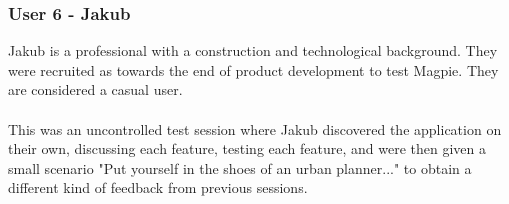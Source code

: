\subsubsection{User 6 - Jakub}
Jakub is a professional with a construction and technological background. They were recruited as towards the end of product development to test Magpie. They are considered a casual user.\\\\
This was an uncontrolled test session where Jakub discovered the application on their own, discussing each feature, testing each feature, and were then given a small scenario "Put yourself in the shoes of an urban planner..." to obtain a different kind of feedback from previous sessions.\\\\
